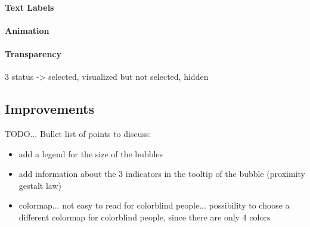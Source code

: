 \paragraph{Text Labels}

\paragraph{Animation}

\paragraph{Transparency}
3 status -> selected, visualized but not selected, hidden



\subsection{Improvements}
TODO...
Bullet list of points to discuss:
\begin{itemize}
    \item add a legend for the size of the bubbles
    \item add information about the 3 indicators in the tooltip of the bubble (proximity gestalt law)

    \item colormap... not easy to read for colorblind people... possibility to choose a different colormap for colorblind people, since there are only 4 colors
\end{itemize}
